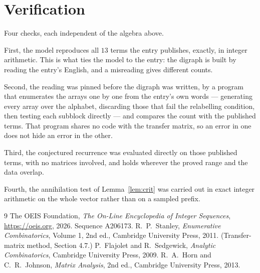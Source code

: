 \documentclass[11pt,a4paper]{article}
\theoremstyle{plain}
\theoremstyle{definition}
\begin{document}
\section{Verification}

Four checks, each independent of the algebra above.

First, the model reproduces all $13$ terms the entry publishes, exactly, in integer
arithmetic. This is what ties the model to the entry: the digraph is built by reading the
entry's English, and a misreading gives different counts.

Second, the reading was pinned before the digraph was written, by a program that enumerates
the arrays one by one from the entry's own words --- generating every array over the
alphabet, discarding those that fail the relabelling condition, then testing each subblock
directly --- and compares the count with the published terms. That program shares no code
with the transfer matrix, so an error in one does not hide an error in the other.

Third, the conjectured recurrence was evaluated directly on those published terms, with no
matrices involved, and holds wherever the proved range and the data overlap.

Fourth, the annihilation test of Lemma~\ref{lem:crit} was carried out in exact integer
arithmetic on the whole vector rather than on a sampled prefix.

\begin{thebibliography}{9}
 The OEIS Foundation, \emph{The On-Line Encyclopedia of Integer
Sequences}, \url{https://oeis.org}, 2026. Sequence A206173.
 R.~P.~Stanley, \emph{Enumerative Combinatorics}, Volume 1, 2nd ed.,
Cambridge University Press, 2011. (Transfer-matrix method, Section 4.7.)
 P.~Flajolet and R.~Sedgewick, \emph{Analytic Combinatorics}, Cambridge
University Press, 2009.
 R.~A.~Horn and C.~R.~Johnson, \emph{Matrix Analysis}, 2nd ed., Cambridge
University Press, 2013.
\end{thebibliography}
\end{document}
